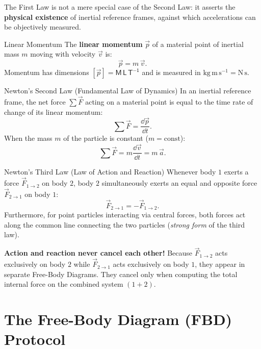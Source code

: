 The First Law is not a mere special case of the Second Law: it asserts the \textbf{physical existence} of inertial reference frames, against which accelerations can be objectively measured.

\begin{definitionbox}{Linear Momentum}
The \textbf{linear momentum} $\vec{p}$ of a material point of inertial mass $m$ moving with velocity $\vec{v}$ is:
\[
\boxed{\vec{p} = m\,\vec{v}.}
\]
Momentum has dimensions $[\vec{p}] = \mathsf{M\,L\,T^{-1}}$ and is measured in $\mathrm{kg\,m\,s^{-1}} = \mathrm{N\,s}$.
\end{definitionbox}

\begin{lawbox}{Newton's Second Law (Fundamental Law of Dynamics)}
In an inertial reference frame, the net force $\sum\vec{F}$ acting on a material point is equal to the time rate of change of its linear momentum:
\[
\boxed{\sum\vec{F} = \frac{\dd\vec{p}}{\dd t}.}
\]
When the mass $m$ of the particle is constant ($m = \text{const}$):
\[
\boxed{\sum\vec{F} = m\frac{\dd\vec{v}}{\dd t} = m\,\vec{a}.}
\]
\end{lawbox}

\begin{lawbox}{Newton's Third Law (Law of Action and Reaction)}
Whenever body $1$ exerts a force $\vec{F}_{1\to 2}$ on body $2$, body $2$ simultaneously exerts an equal and opposite force $\vec{F}_{2\to 1}$ on body $1$:
\[
\boxed{\vec{F}_{2\to 1} = -\vec{F}_{1\to 2}.}
\]
Furthermore, for point particles interacting via central forces, both forces act along the common line connecting the two particles (\emph{strong form} of the third law).
\end{lawbox}

\begin{cautionbox}
\textbf{Action and reaction never cancel each other!} Because $\vec{F}_{1\to 2}$ acts exclusively on body $2$ while $\vec{F}_{2\to 1}$ acts exclusively on body $1$, they appear in separate Free-Body Diagrams. They cancel only when computing the total internal force on the combined system $(1 + 2)$.
\end{cautionbox}

\section{The Free-Body Diagram (FBD) Protocol}


